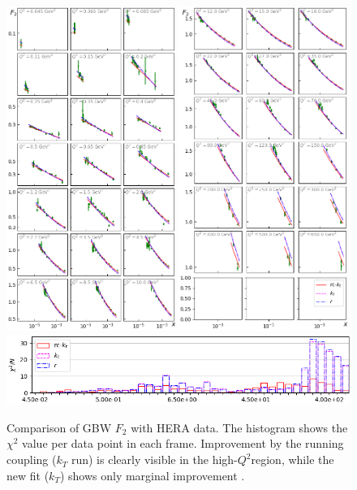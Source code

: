 \documentclass[12pt]{article}
\numberwithin{equation}{section}
\numberwithin{table}{section}
\numberwithin{figure}{section}
\begin{document}
\begin{figure}[p]
\includegraphics[width=0.49\textwidth]{./plots/Figure_1.png}
\includegraphics[width=0.49\textwidth]{./plots/Figure_2.png}
\includegraphics[width=\textwidth]{./plots/Figure_3.png}
\vspace{2mm}
\caption{Comparison of GBW $F_2$ with HERA data. The histogram shows the $\chi^2$ value per data point in each frame.
 Improvement by the running coupling ($k_T$ run) is clearly visible in the high-$Q^2$region, while the new fit ($k_T$) shows only marginal improvement .  }
\label{fig:GBW-Grid}
\end{figure}
\end{document}
